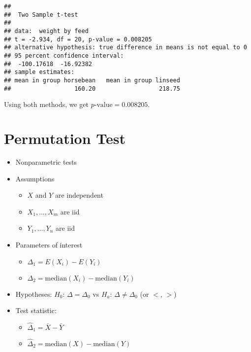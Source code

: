 \documentclass[
]{book}
\providecommand{\tightlist}{%
  \setlength{\itemsep}{0pt}\setlength{\parskip}{0pt}}
\begin{document}
\begin{verbatim}
## 
##  Two Sample t-test
## 
## data:  weight by feed
## t = -2.934, df = 20, p-value = 0.008205
## alternative hypothesis: true difference in means is not equal to 0
## 95 percent confidence interval:
##  -100.17618  -16.92382
## sample estimates:
## mean in group horsebean   mean in group linseed 
##                  160.20                  218.75
\end{verbatim}

Using both methods, we get \(p\text{-value} = 0.008205\).

\hypertarget{permutation-test-1}{%
\section{Permutation Test}\label{permutation-test-1}}

\begin{itemize}
\tightlist
\item
  Nonparametric tests
\item
  Assumptions

  \begin{itemize}
  \tightlist
  \item
    \(X\) and \(Y\) are independent
  \item
    \(X_1, \dots, X_m\) are iid
  \item
    \(Y_1, \dots, Y_n\) are iid
  \end{itemize}
\item
  Parameters of interest

  \begin{itemize}
  \tightlist
  \item
    \(\Delta_1 = E(X_i) - E(Y_i)\)
  \item
    \(\Delta_2 = \mathrm{median}(X_i) - \mathrm{median}(Y_i)\)
  \end{itemize}
\item
  Hypotheses: \(H_0\): \(\Delta = \Delta_0\) vs \(H_a\): \(\Delta \neq \Delta_0\) (or \(<\), \(>\))
\item
  Test statistic:

  \begin{itemize}
  \tightlist
  \item
    \(\hat{\Delta}_1 = \bar{X} - \bar{Y}\)
  \item
    \(\hat{\Delta}_2 = \mathrm{median}(X) - \mathrm{median}(Y)\)
  \end{itemize}
\end{itemize}
\end{document}
